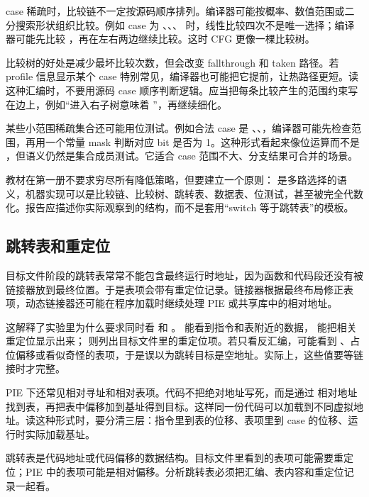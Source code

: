 case 稀疏时，比较链不一定按源码顺序排列。编译器可能按概率、数值范围或二分搜索形状组织比较。例如 case 为 、、、 时，线性比较四次不是唯一选择；编译器可能先比较 ，再在左右两边继续比较。这时 CFG 更像一棵比较树。

比较树的好处是减少最坏比较次数，但会改变 fallthrough 和 taken 路径。若 profile 信息显示某个 case 特别常见，编译器也可能把它提前，让热路径更短。读这种汇编时，不要用源码 case 顺序判断逻辑。应当把每条比较产生的范围约束写在边上，例如“进入右子树意味着 ”，再继续细化。

某些小范围稀疏集合还可能用位测试。例如合法 case 是 、、，编译器可能先检查范围，再用一个常量 mask 判断对应 bit 是否为 1。这种形式看起来像位运算而不是 ，但语义仍然是集合成员测试。它适合 case 范围不大、分支结果可合并的场景。

教材在第一册不要求穷尽所有降低策略，但要建立一个原则： 是多路选择的语义，机器实现可以是比较链、比较树、跳转表、数据表、位测试，甚至被完全代数化。报告应描述你实际观察到的结构，而不是套用“switch 等于跳转表”的模板。

\subsection{跳转表和重定位}

目标文件阶段的跳转表常常不能包含最终运行时地址，因为函数和代码段还没有被链接器放到最终位置。于是表项会带有重定位记录。链接器根据最终布局修正表项，动态链接器还可能在程序加载时继续处理 PIE 或共享库中的相对地址。

这解释了实验里为什么要求同时看  和 。 能看到指令和表附近的数据， 能把相关重定位显示出来； 则列出目标文件里的重定位项。若只看反汇编，可能看到 、占位偏移或看似奇怪的表项，于是误以为跳转目标是空地址。实际上，这些值要等链接时才完整。

PIE 下还常见相对寻址和相对表项。代码不把绝对地址写死，而是通过  相对地址找到表，再把表中偏移加到基址得到目标。这样同一份代码可以加载到不同虚拟地址。读这种形式时，要分清三层：指令里到表的位移、表项里到 case 的位移、运行时实际加载基址。

\begin{keyidea}
跳转表是代码地址或代码偏移的数据结构。目标文件里看到的表项可能需要重定位；PIE 中的表项可能是相对偏移。分析跳转表必须把汇编、表内容和重定位记录一起看。
\end{keyidea}


